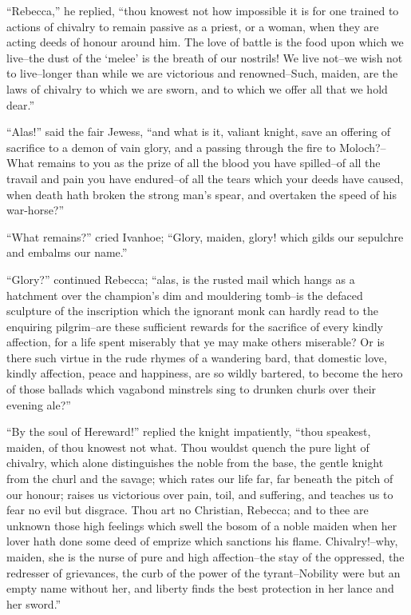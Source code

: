``Rebecca,'' he replied, ``thou knowest not how impossible it is for one
trained to actions of chivalry to remain passive as a priest, or a
woman, when they are acting deeds of honour around him. The love of
battle is the food upon which we live--the dust of the `melee' is the
breath of our nostrils! We live not--we wish not to live--longer than
while we are victorious and renowned--Such, maiden, are the laws of
chivalry to which we are sworn, and to which we offer all that we hold
dear.''

``Alas!'' said the fair Jewess, ``and what is it, valiant knight, save
an offering of sacrifice to a demon of vain glory, and a passing through
the fire to Moloch?--What remains to you as the prize of all the blood
you have spilled--of all the travail and pain you have endured--of all
the tears which your deeds have caused, when death hath broken the
strong man's spear, and overtaken the speed of his war-horse?''

``What remains?'' cried Ivanhoe; ``Glory, maiden, glory! which gilds our
sepulchre and embalms our name.''

``Glory?'' continued Rebecca; ``alas, is the rusted mail which hangs as
a hatchment over the champion's dim and mouldering tomb--is the defaced
sculpture of the inscription which the ignorant monk can hardly read to
the enquiring pilgrim--are these sufficient rewards for the sacrifice of
every kindly affection, for a life spent miserably that ye may make
others miserable? Or is there such virtue in the rude rhymes of a
wandering bard, that domestic love, kindly affection, peace and
happiness, are so wildly bartered, to become the hero of those ballads
which vagabond minstrels sing to drunken churls over their evening
ale?''

``By the soul of Hereward!'' replied the knight impatiently, ``thou
speakest, maiden, of thou knowest not what. Thou wouldst quench the pure
light of chivalry, which alone distinguishes the noble from the base,
the gentle knight from the churl and the savage; which rates our life
far, far beneath the pitch of our honour; raises us victorious over
pain, toil, and suffering, and teaches us to fear no evil but disgrace.
Thou art no Christian, Rebecca; and to thee are unknown those high
feelings which swell the bosom of a noble maiden when her lover hath
done some deed of emprize which sanctions his flame. Chivalry!--why,
maiden, she is the nurse of pure and high affection--the stay of the
oppressed, the redresser of grievances, the curb of the power of the
tyrant--Nobility were but an empty name without her, and liberty finds
the best protection in her lance and her sword.''

